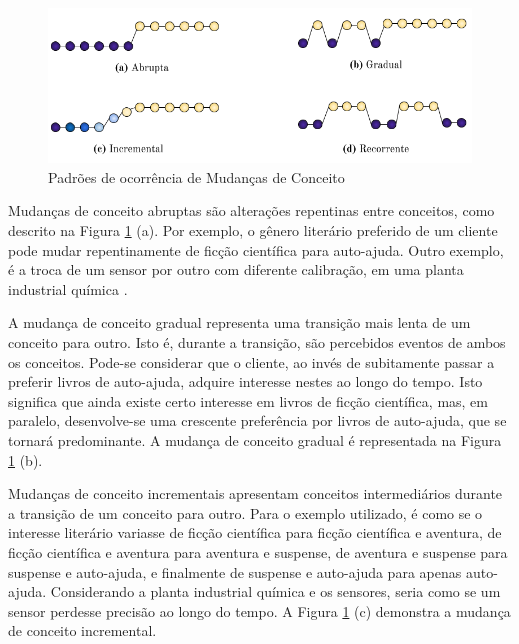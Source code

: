 \documentclass[qual, classic, a4paper]{ufbathesis}
\begin{document}
\begin{figure}[H]
\begin{center}
    \includegraphics[scale=0.8]{imagens/concept_drift_patterns.png}
    \caption{Padrões de ocorrência de Mudanças de Conceito}
    \label{fig:concept_drift_patterns}
\end{center}
\end{figure}

Mudanças de conceito abruptas são alterações repentinas entre conceitos, como descrito na Figura \ref{fig:concept_drift_patterns} (a).
Por exemplo, o gênero literário preferido de um cliente pode mudar repentinamente de ficção científica para auto-ajuda.
Outro exemplo, é a troca de um sensor por outro com diferente calibração, em uma planta industrial química \cite{Gama:2014:SCD:2597757.2523813}. 

A mudança de conceito gradual representa uma transição mais lenta de um conceito para outro.
Isto é, durante a transição, são percebidos eventos de ambos os conceitos.
Pode-se considerar que o cliente, ao invés de subitamente passar a preferir livros de auto-ajuda, adquire interesse nestes ao longo do tempo.
Isto significa que ainda existe certo interesse em livros de ficção científica, mas, em paralelo, desenvolve-se uma crescente preferência por livros de auto-ajuda, que se tornará predominante.
A mudança de conceito gradual é representada na Figura \ref{fig:concept_drift_patterns} (b).

Mudanças de conceito incrementais apresentam conceitos intermediários durante a transição de um conceito para outro.
Para o exemplo utilizado, é como se o interesse literário variasse de ficção científica para ficção científica e aventura, 
de ficção científica e aventura para aventura e suspense, de aventura e suspense para suspense e auto-ajuda, e finalmente de suspense e auto-ajuda para apenas auto-ajuda.
Considerando a planta industrial química e os sensores, seria como se um sensor perdesse precisão ao longo do tempo. 
A Figura \ref{fig:concept_drift_patterns} (c) demonstra a mudança de conceito incremental. 
\end{document}
